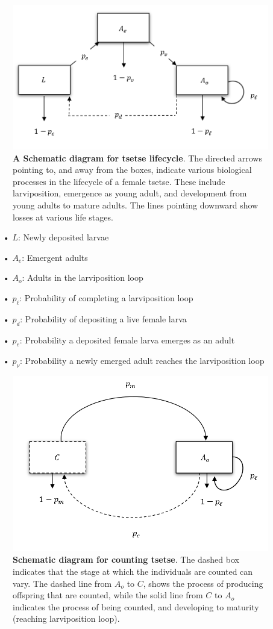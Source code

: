 \documentclass[smallextended]{svjour3}
\begin{document}
\begin{figure}[hbt!]
	\centering
	\includegraphics[width=0.7\linewidth]{Bioflowchart.png}
	\caption{\textbf{A Schematic diagram for tsetse lifecycle}. The directed arrows pointing to, and away from the boxes, indicate various biological processes in the lifecycle of a female tsetse. These include larviposition, emergence as young adult, and development from young adults to mature adults. The lines pointing downward show losses at various life stages.}
	\label{fig:bioflowchart}
\end{figure}

\begin{itemize}
	\item[•] $L$: Newly deposited larvae
	\item[•] $A_{e}$: Emergent adults
	\item[•] $A_{o}$: Adults in the larviposition loop
	\item[•] $p_{\ell}$: Probability of completing a larviposition loop 
	\item[•] $p_d$: Probability of depositing a live female larva 
	\item[•] $p_e$: Probability a deposited female larva emerges as an adult 
	\item[•] $p_{\nu}$: Probability a newly emerged adult reaches the larviposition loop 
\end{itemize}





\begin{figure}[hbt!]
	\centering
	\includegraphics[width=0.7\linewidth]{Compflowchart.png}
	\caption{\textbf{Schematic diagram for counting tsetse}. The dashed box indicates that the stage at which the individuals are counted can vary. The dashed line from $A_{o}$ to $C$, shows the process of producing offspring that are counted, while the solid line from $C$ to $A_{o}$ indicates the process of being counted, and developing to maturity (reaching larviposition loop).}
	\label{fig:compflowchart}
\end{figure}
\end{document}
